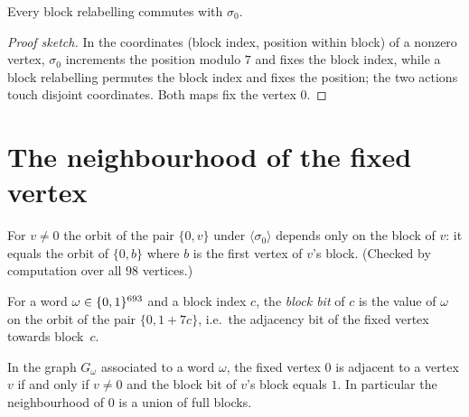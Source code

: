 \begin{lemma}\label{lem:lex-relabel-comm}
Every block relabelling commutes with $\sigma_0$.
\leanok
{}
\end{lemma}

\begin{proof}[Proof sketch]
In the coordinates (block index, position within block) of a nonzero vertex,
$\sigma_0$ increments the position modulo $7$ and fixes the block index,
while a block relabelling permutes the block index and fixes the position;
the two actions touch disjoint coordinates.  Both maps fix the vertex $0$.
\end{proof}

\section{The neighbourhood of the fixed vertex}

\begin{fact}\label{fact:lex-orbit-block}
For $v \neq 0$ the orbit of the pair $\{0,v\}$ under
$\langle\sigma_0\rangle$ depends only on the block of $v$: it equals the
orbit of $\{0, b\}$ where $b$ is the first vertex of $v$'s block.  (Checked
by computation over all $98$ vertices.)
\leanok
{}
\end{fact}

\begin{definition}\label{def:lex-block-bit}
For a word $\omega \in \{0,1\}^{693}$ and a block index $c$, the \emph{block
bit} of $c$ is the value of $\omega$ on the orbit of the pair
$\{0, 1+7c\}$, i.e.\ the adjacency bit of the fixed vertex towards
block~$c$.
\leanok
{}
\end{definition}

\begin{lemma}\label{lem:lex-adj-block}
In the graph $G_\omega$ associated to a word $\omega$, the fixed vertex $0$
is adjacent to a vertex $v$ if and only if $v \neq 0$ and the block bit of
$v$'s block equals $1$.  In particular the neighbourhood of $0$ is a union
of full blocks.
\leanok
{}
\end{lemma}

